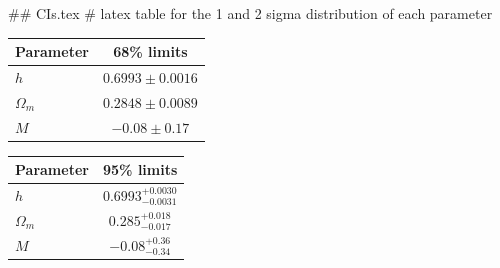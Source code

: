 ## CIs.tex
# latex table for the 1 and 2 sigma distribution of each parameter

\begin{tabular} { l  c}
 Parameter &  68\% limits\\
\hline
{\boldmath$h              $} & $0.6993\pm 0.0016          $\\
{\boldmath$\Omega_m       $} & $0.2848\pm 0.0089          $\\
{\boldmath$M              $} & $-0.08\pm 0.17             $\\
\hline
\end{tabular}

\begin{tabular} { l  c}
 Parameter &  95\% limits\\
\hline
{\boldmath$h              $} & $0.6993^{+0.0030}_{-0.0031}$\\
{\boldmath$\Omega_m       $} & $0.285^{+0.018}_{-0.017}   $\\
{\boldmath$M              $} & $-0.08^{+0.36}_{-0.34}     $\\
\hline
\end{tabular}
